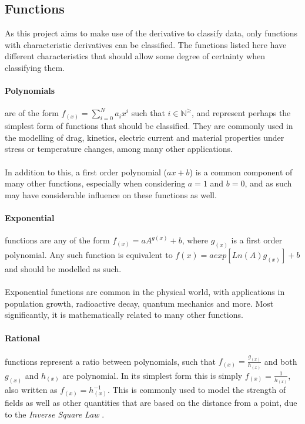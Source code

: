 \documentclass[main.tex]{subfiles}
\begin{document}
    \subsection{Functions}
    
    As this project aims to make use of the derivative to classify data, only functions with characteristic derivatives can be classified. The functions listed here have different characteristics that should allow some degree of certainty when classifying them.
    \paragraph{Polynomials} are of the form $f_{(x)}=\sum_{i=0}^{N} a_i x^i$ such that $i \in \mathbb{N}^\geq$, and represent perhaps the simplest form of functions that should be classified. They are commonly used in the modelling of drag, kinetics, electric current and material properties under stress or temperature changes, among many other applications. 
    \\\\
    In addition to this, a first order polynomial ($a x + b$) is a common component of many other functions, especially when considering $a=1$ and $b=0$, and as such may have considerable influence on these functions as well.
    \paragraph{Exponential} functions are any of the form $f_{(x)}= a A^{g(x)} + b$, where $g_{(x)}$ is a first order polynomial. Any such function is equivalent to $ f{(x)} =  a exp[  Ln(A) g_{(x)}  ] +b $ and should be modelled as such. 
    \\\\
    Exponential functions are common in the physical world, with applications in population growth, radioactive decay, quantum mechanics and more. Most significantly, it is mathematically related to many other functions.
    \paragraph{Rational} functions represent a ratio between polynomials, such that $f_{(x)}=\frac{g_{(x)}}{h_{(x)}}$ and both $g_{(x)}$ and $h_{(x)}$ are polynomial. In its simplest form this is simply $f_{(x)}=\frac{1}{h_{(x)}}$, also written as $f_{(x)}=h_{(x)}^{-1}$. This is commonly used to model the strength of fields as well as other quantities that are based on the distance from a point, due to the \textit{Inverse Square Law} \cite{}. 
\end{document}
